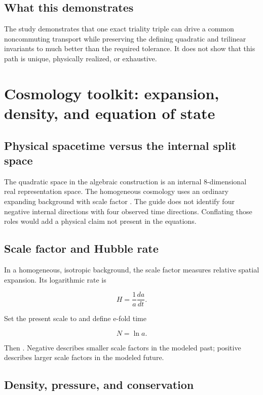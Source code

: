 \documentclass[11pt]{article}
\begin{document}
\subsection{What this demonstrates}

The study demonstrates that one exact triality triple can drive a common noncommuting transport while preserving the defining quadratic and trilinear invariants to much better than the required tolerance. It does not show that this path is unique, physically realized, or exhaustive.

\section{Cosmology toolkit: expansion, density, and equation of state}

\subsection{Physical spacetime versus the internal split space}

The \texttt{} quadratic space in the algebraic construction is an internal 8-dimensional real representation space. The homogeneous cosmology uses an ordinary expanding background with scale factor \texttt{}. The guide does not identify four negative internal directions with four observed time directions. Conflating those roles would add a physical claim not present in the equations.

\subsection{Scale factor and Hubble rate}

In a homogeneous, isotropic background, the scale factor \texttt{} measures relative spatial expansion. Its logarithmic rate is

\[
H=\frac{1}{a}\frac{da}{dt}.
\]

Set the present scale to \texttt{} and define e-fold time

\[
N=\ln a.
\]

Then \texttt{}. Negative \texttt{} describes smaller scale factors in the modeled past; positive \texttt{} describes larger scale factors in the modeled future.

\subsection{Density, pressure, and conservation}
\end{document}
